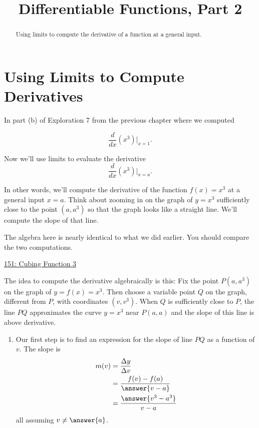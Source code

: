\documentclass{ximera}
\title{Differentiable Functions, Part 2}
\begin{document}
\begin{abstract}
Using limits to compute the derivative of a function at a general input.
\end{abstract}
\maketitle

\section{Using Limits to Compute Derivatives}

\begin{exploration}   \label{Expdsfdsftttehh030}
In part (b) of Exploration 7 from the previous chapter where we computed

\[
   \frac{d}{dx}\left( x^3 \right) \Big|_{x=1}.
\]

Now we'll use limits to evaluate the derivative
\[
   \frac{d}{dx}\left( x^3 \right) \Big|_{x=a}.
\]

In other words, we'll compute the derivative of the function $f(x)=x^3$ at a general input $x=a$. Think about zooming in on the graph of $y=x^3$ sufficiently close to the point $(a,a^3)$ so that the graph looks like a straight line. We'll compute the slope of that line.

The algebra here is nearly identical to what we did earlier. You should compare the two computations. 

\begin{onlineOnly}
    \begin{center}
\end{center}
\end{onlineOnly}

\href{https://www.desmos.com/calculator/8eiffwbgt5}{151: Cubing Function 3}


The idea to compute the derivative algebraically is this: Fix the point $P(a,a^3)$ on the graph of $y=f(x)=x^3$. Then choose a variable point $Q$ on the graph, different from $P$, with coordinates $(v,v^3)$. When $Q$ is sufficiently close to $P$, the line $PQ$ approximates the curve $y=x^3$ near $P(a,a)$ and the slope of this line is above derivative. 

\begin{enumerate}
\item Our first step is to find an expression for the slope of line $PQ$ as a function of $v$. The slope is
\begin{align*}
        m(v) &= \frac{\Delta y}{\Delta v}  \\
                & = \frac{f(v) - f(a)}{\answer{v-a}} \\
                & = \frac{\answer{v^3-a^3}}{v-a} \\
\end{align*}
all assuming $v\neq \answer{a}$.



\end{enumerate}
\end{exploration}
\end{document}
